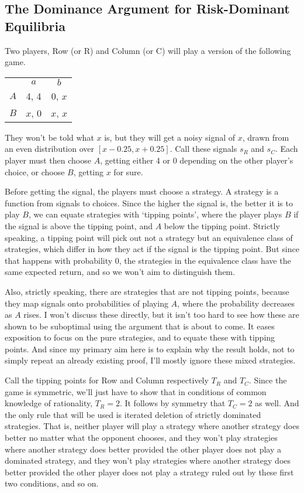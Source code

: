 \documentclass[11pt,]{book}
\def\toprule{}
\def\bottomrule{}
\begin{document}
\hypertarget{cvdproof}{%
\subsection{The Dominance Argument for Risk-Dominant Equilibria}\label{cvdproof}}

Two players, Row (or R) and Column (or C) will play a version of the following game.

\begin{longtable}[]{@{}lcc@{}}
\toprule
\endhead
& \(a\) & \(b\)\tabularnewline
\(A\) & 4, 4 & 0, \(x\)\tabularnewline
\(B\) & \(x\), 0 & \(x\), \(x\)\tabularnewline
\bottomrule
\end{longtable}

They won't be told what \(x\) is, but they will get a noisy signal of \(x\), drawn from an even distribution over \([x - 0.25, x + 0.25]\). Call these signals \(s_R\) and \(s_C\). Each player must then choose \(A\), getting either 4 or 0 depending on the other player's choice, or choose \(B\), getting \(x\) for sure.

Before getting the signal, the players must choose a strategy. A strategy is a function from signals to choices. Since the higher the signal is, the better it is to play \(B\), we can equate strategies with `tipping points', where the player plays \(B\) if the signal is above the tipping point, and \(A\) below the tipping point. Strictly speaking, a tipping point will pick out not a strategy but an equivalence class of strategies, which differ in how they act if the signal is the tipping point. But since that happens with probability 0, the strategies in the equivalence class have the same expected return, and so we won't aim to distinguish them.

Also, strictly speaking, there are strategies that are not tipping points, because they map signals onto probabilities of playing \(A\), where the probability decreases as \(A\) rises. I won't discuss these directly, but it isn't too hard to see how these are shown to be suboptimal using the argument that is about to come. It eases exposition to focus on the pure strategies, and to equate these with tipping points. And since my primary aim here is to explain why the result holds, not to simply repeat an already existing proof, I'll mostly ignore these mixed strategies.

Call the tipping points for Row and Column respectively \(T_R\) and \(T_C\). Since the game is symmetric, we'll just have to show that in conditions of common knowledge of rationality, \(T_R = 2\). It follows by symmetry that \(T_C = 2\) as well. And the only rule that will be used is iterated deletion of strictly dominated strategies. That is, neither player will play a strategy where another strategy does better no matter what the opponent chooses, and they won't play strategies where another strategy does better provided the other player does not play a dominated strategy, and they won't play strategies where another strategy does better provided the other player does not play a strategy ruled out by these first two conditions, and so on.
\end{document}
